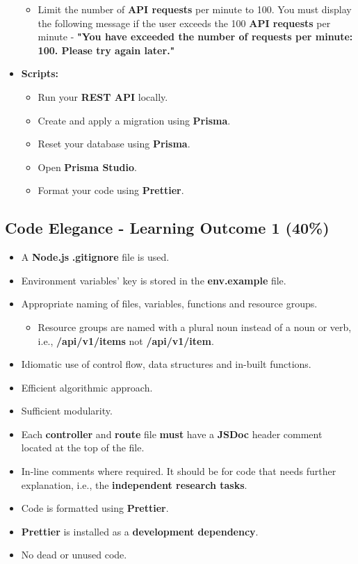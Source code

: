 \documentclass{article}
\begin{document}
\begin{itemize}
\begin{itemize}
		\item Limit the number of \textbf{API requests} per minute to 100. You must display the following message if the user exceeds the 100 \textbf{API requests} per minute - \textbf{"You have exceeded the number of requests per minute: 100. Please try again later."}
	\end{itemize}
	\item \textbf{Scripts:}
	\begin{itemize}
		\item Run your \textbf{REST API} locally.
		\item Create and apply a migration using \textbf{Prisma}.
		\item Reset your database using \textbf{Prisma}.
		\item Open \textbf{Prisma Studio}. 
		\item Format your code using \textbf{Prettier}.
	\end{itemize}
\end{itemize}

\subsection*{Code Elegance - Learning Outcome 1 (40\%)}
\begin{itemize}
	\item A \textbf{Node.js} \textbf{.gitignore} file is used.
	\item Environment variables' key is stored in the \textbf{env.example} file. 
  \item Appropriate naming of files, variables, functions and resource groups.
  \begin{itemize}
	\item Resource groups are named with a plural noun instead of a noun or verb, i.e., \textbf{/api/v1/items} not \textbf{/api/v1/item}.
  \end{itemize}
	\item Idiomatic use of control flow, data structures and in-built functions.
  \item Efficient algorithmic approach.
  \item Sufficient modularity.
  \item Each \textbf{controller} and \textbf{route} file \textbf{must} have a \textbf{JSDoc} header comment located at the top of the file.
\item In-line comments where required. It should be for code that needs further explanation, i.e., the \textbf{independent research tasks}.
  \item Code is formatted using \textbf{Prettier}.
  \item \textbf{Prettier} is installed as a \textbf{development dependency}.	
\item No dead or unused code. 
\end{itemize}
\end{document}
